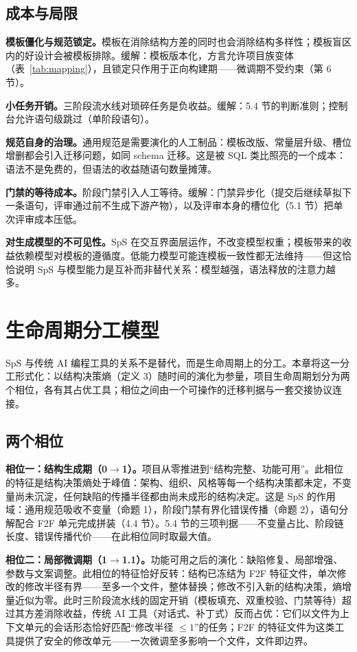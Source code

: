 \documentclass[11pt,a4paper]{ctexart}
\begin{document}
\subsection{成本与局限}
\textbf{模板僵化与规范锁定。}模板在消除结构方差的同时也会消除结构多样性；模板盲区内的好设计会被模板排除。缓解：模板版本化，方言允许项目族变体（表~\ref{tab:mapping}），且锁定只作用于正向构建期——微调期不受约束（第 6 节）。

\textbf{小任务开销。}三阶段流水线对琐碎任务是负收益。缓解：5.4 节的判断准则；控制台允许语句级跳过（单阶段语句）。

\textbf{规范自身的治理。}通用规范是需要演化的人工制品：模板改版、常量层升级、槽位增删都会引入迁移问题，如同 schema 迁移。这是被 SQL 类比照亮的一个成本：语法不是免费的，但语法的收益随语句数量摊薄。

\textbf{门禁的等待成本。}阶段门禁引入人工等待。缓解：门禁异步化（提交后继续草拟下一条语句，评审通过前不生成下游产物），以及评审本身的槽位化（5.1 节）把单次评审成本压低。

\textbf{对生成模型的不可见性。}SpS 在交互界面层运作，不改变模型权重；模板带来的收益依赖模型对模板的遵循度。低能力模型可能连模板一致性都无法维持——但这恰恰说明 SpS 与模型能力是互补而非替代关系：模型越强，语法释放的注意力越多。

\section{生命周期分工模型}
SpS 与传统 AI 编程工具的关系不是替代，而是生命周期上的分工。本章将这一分工形式化：以结构决策熵（定义 3）随时间的演化为参量，项目生命周期划分为两个相位，各有其占优工具；相位之间由一个可操作的迁移判据与一套交接协议连接。

\subsection{两个相位}
\textbf{相位一：结构生成期（0$\to$1）。}项目从零推进到“结构完整、功能可用”。此相位的特征是结构决策熵处于峰值：架构、组织、风格等每一个结构决策都未定，不变量尚未沉淀，任何缺陷的传播半径都由尚未成形的结构决定。这是 SpS 的作用域：通用规范吸收不变量（命题 1），阶段门禁有界化错误传播（命题 2），语句分解配合 F2F 单元完成拼装（4.4 节）。5.4 节的三项判据——不变量占比、阶段链长度、错误传播代价——在此相位同时取最大值。

\textbf{相位二：局部微调期（1$\to$1.1）。}功能可用之后的演化：缺陷修复、局部增强、参数与文案调整。此相位的特征恰好反转：结构已冻结为 F2F 特征文件，单次修改的修改半径有界——至多一个文件，整体替换\cite{ref20}；修改不引入新的结构决策，熵增量近似为零。此时三阶段流水线的固定开销（模板填充、双重校验、门禁等待）超过其方差消除收益，传统 AI 工具（对话式、补丁式）反而占优：它们以文件为上下文单元的会话形态恰好匹配“修改半径 $\le 1$”的任务；F2F 的特征文件为这类工具提供了安全的修改单元——一次微调至多影响一个文件，文件即边界。
\end{document}
